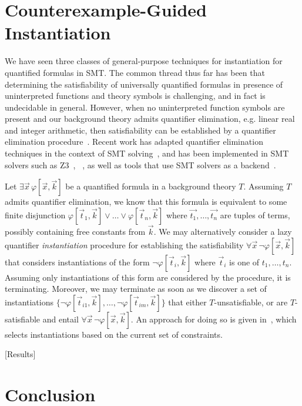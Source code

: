 \documentclass[oribibl]{llncs}
\begin{document}
\section{Counterexample-Guided Instantiation}
\label{sec:cegqi}

We have seen three classes of general-purpose techniques 
for instantiation for quantified formulas in SMT.
The common thread thus far has been that determining the satisfiability of universally quantified formulas in presence
of uninterpreted functions and theory symbols is challenging, and in fact is undecidable in general.
However, when no uninterpreted function symbols are present and our background theory admits quantifier elimination, 
e.g. linear real and integer arithmetic, then satisfiability 
can be established by a quantifier elimination procedure~\cite{}.
Recent work has adapted quantifier elimination techniques in the context of SMT solving~\cite{},
and has been implemented in SMT solvers such as Z3~\cite{}, \cvc~\cite{},
as well as tools that use SMT solvers as a backend~\cite{}.

Let $\exists \vec x\, \varphi[ \vec x, \vec k ]$ be a quantified formula in a background theory $T$.
Assuming $T$ admits quantifier elimination, we know that this formula is equivalent to some finite disjunction
$\varphi[ \vec t_1, \vec k ] \vee \ldots \vee \varphi[ \vec t_n, \vec k ]$ where $\vec{t_1}, \ldots, \vec{t_n}$ are tuples of terms, possibly containing free constants from $\vec k$.
We may alternatively consider a lazy quantifier \emph{instantiation} procedure for establishing the satisfiability 
$\forall \vec x\, \neg \varphi[ \vec x, \vec k ]$ that considers instantiations of the form 
$\neg \varphi[ \vec t_i, \vec k ]$ where $\vec t_i$ is one of $t_1, \ldots, t_n$.
Assuming only instantiations of this form are considered by the procedure, it is terminating.
Moreover, we may terminate as soon as we discover a set of instantiations $\{ \neg \varphi[ \vec t_{i1}, \vec k ], \ldots, \neg \varphi[ \vec t_{im}, \vec k ] \}$ that either
$T$-unsatisfiable, or are $T$-satisfiable and entail $\forall \vec x\, \neg \varphi[ \vec x, \vec k ]$.
An approach for doing so is given in~\cite{}, which selects instantiations based on the current set of constraints.
\begin{example}

\end{example}

[Results]

\section{Conclusion}
\label{sec:conclusion}
\end{document}
